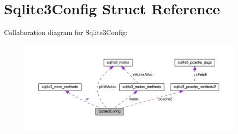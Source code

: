 \hypertarget{structSqlite3Config}{}\section{Sqlite3\+Config Struct Reference}
\label{structSqlite3Config}


Collaboration diagram for Sqlite3\+Config\+:\nopagebreak
\begin{figure}[H]
\begin{center}
\leavevmode
\includegraphics[width=350pt]{structSqlite3Config__coll__graph}
\end{center}
\end{figure}
